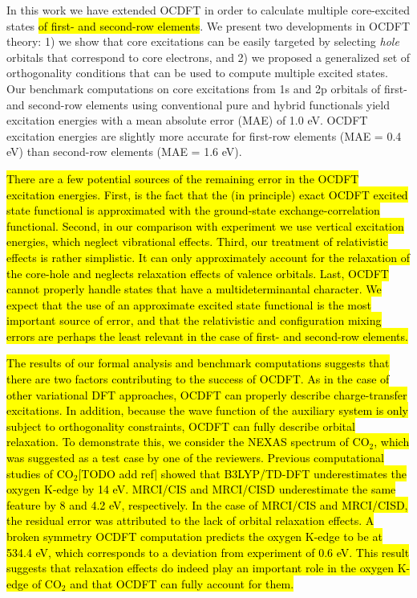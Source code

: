 \documentclass[12pt]{article}
\begin{document}
In this work we have extended OCDFT in order to calculate multiple core-excited states \hl{of first- and second-row elements}.
We present two developments in OCDFT theory: 1) we show that core excitations can be easily targeted by selecting \textit{hole} orbitals that correspond to core electrons, and 2) we proposed a generalized set of orthogonality conditions that can be used to compute multiple excited states.
Our benchmark computations on core excitations from 1s and 2p orbitals of first- and second-row elements using conventional pure and hybrid functionals yield excitation energies with a mean absolute error (MAE) of 1.0 eV.
OCDFT excitation energies are slightly more accurate for first-row elements (MAE = 0.4 eV) than second-row elements (MAE = 1.6 eV).

\hl{There are a few potential sources of the remaining error in the OCDFT excitation energies.  First, is the fact that the (in principle) exact OCDFT excited state functional is approximated with the ground-state exchange-correlation functional.
Second, in our comparison with experiment we use vertical excitation energies, which neglect vibrational effects.
Third, our treatment of relativistic effects is rather simplistic.   It can only approximately account for the relaxation of the core-hole and neglects relaxation effects of valence orbitals.  Last, OCDFT cannot properly handle states that have a multideterminantal character.
We expect that the use of an approximate excited state functional is the most important source of error, and that the relativistic and configuration mixing errors are perhaps the least relevant in the case of first- and second-row elements.
}

\hl{The results of our formal analysis and benchmark computations suggests that there are two factors contributing to the success of OCDFT.
As in the case of other variational DFT approaches, OCDFT can properly describe charge-transfer excitations.
In addition, because the wave function of the auxiliary system is only subject to orthogonality constraints, OCDFT can fully describe orbital relaxation.
To demonstrate this, we consider the NEXAS spectrum of CO$_2$, which was suggested as a test case by one of the reviewers. 
Previous computational studies of CO$_2$[TODO add ref] showed that B3LYP/TD-DFT underestimates the oxygen K-edge by 14 eV.
MRCI/CIS and MRCI/CISD underestimate the same feature by 8 and 4.2 eV, respectively.
In the case of MRCI/CIS and MRCI/CISD, the residual error was attributed to the lack of orbital relaxation effects.
A broken symmetry OCDFT computation predicts the oxygen K-edge to be at 534.4 eV, which corresponds to a deviation from experiment of 0.6 eV.  This result suggests that relaxation effects do indeed play an important role in the oxygen K-edge of CO$_2$ and that OCDFT can fully account for them.
}
\end{document}

